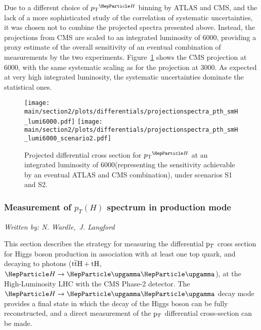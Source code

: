 Due to a different choice of $\pTH$ binning by ATLAS and CMS, and the lack of a more sophisticated study of the correlation of systematic uncertainties, it was chosen not to combine the projected spectra presented above. Instead, the projections from CMS are scaled to an integrated luminosity of 6000\fbinv, providing a proxy estimate of the overall sensitivity of an eventual combination of measurements by the two experiments. Figure~\ref{fig:proj_pth_6000} shows the CMS projection at 6000\fbinv, with the same systematic scaling as for the projection at 3000\fbinv.  As expected at very high integrated luminosity, the systematic uncertainties dominate the statistical ones.

\begin{figure}%
  \centering
  \texttt{[image: \\main/section2/plots/differentials/projectionspectra\_pth\_smH\_lumi6000.pdf]}
  \texttt{[image: \\main/section2/plots/differentials/projectionspectra\_pth\_smH\_lumi6000\_scenario2.pdf]}
  \caption{Projected differential cross section for $\pTH$ at an integrated luminosity of 6000\fbinv (representing the sensitivity achievable by an eventual ATLAS and CMS combination), under scenarios S1
    and S2.}
  \label{fig:proj_pth_6000}
\end{figure}

\subsubsection{Measurement of $p_{T}(H)$ spectrum  in \ttH production mode}
\label{sec:ttHdiffxs}

\begin{center}{\it Written by: N. Wardle,~J. Langford} \end{center}

This section describes the strategy for measuring the differential $\mathrm{p}_{T}$ cross section for 
Higgs boson production in association with at least one top quark, and decaying to photons ($\text{t}\overline{\text{t}}\text{H}+\text{tH}$, $\hgg$), 
at the High-Luminosity LHC with the CMS Phase-2 detector. The $\hgg$ decay mode provides a final state in which the decay of the Higgs boson can be fully reconstructed, and a direct measurement of the $\mathrm{p}_{T}$ differential cross-section can be made. 

